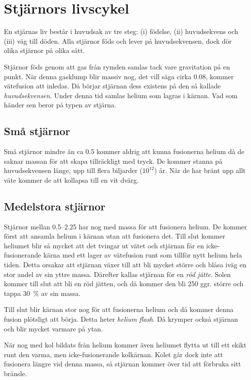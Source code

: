 \section{Stjärnors livscykel}
En stjärnas liv består i huvudsak av tre steg: (i) födelse, (ii) huvudsekvens och (iii) väg till döden. Alla stjärnor föds och lever på huvudsekvensen, dock dör olika stjärnor på olika sätt.

Stjärnor föds genom att gas från rymden samlas tack vare gravitation på en punkt. När denna gasklump blir massiv nog, det vill säga cirka \qty{0.08}{\Mo}, kommer vätefusion att inledas. Då börjar stjärnan dess existens på den så kallade \emph{huvudsekvensen}. Under denna tid samlas helium som lagras i kärnan. Vad som händer sen beror på typen av stjärna.

\subsection{Små stjärnor}
Små stjärnor mindre än ca \qty{0.5}{\Mo} kommer aldrig att kunna fusionerna helium då de saknar massan för att skapa tillräckligt med tryck. De kommer stanna på huvudsekvensen länge, upp till flera biljarder ($10^{12}$) år. När de har bränt upp allt väte kommer de att kollapsa till en vit dvärg.

\subsection{Medelstora stjärnor}
Stjärnor mellan \qtyrange{0.5}{2.25}{\Mo} har nog med massa för att fusionera helium. De kommer först att ansamla helium i kärnan utan att fusionera det. Till slut kommer heliumet blir så mycket att det tvingar ut vätet och stjärnan får en icke-fusionerande kärna med ett lager av vätefusion runt som tillför nytt helium hela tiden. Detta orsakar att stjärnan växer till att bli mycket större och blåsa iväg en stor andel av sin yttre massa. Därefter kallas stjärnan för en \emph{röd jätte}. Solen kommer till slut att bli en röd jätten, och då kommer den bli \num{250} ggr. större och tappa \qty{30}{\percent} av sin massa.

Till slut blir kärnan stor nog för att fusionerna helium och då kommer denna fusion plötsligt att börja. Detta heter \emph{helium flash}. Då krymper också stjärnan och blir mycket varmare på ytan.

När nog med kol bildats från helium kommer även heliumet flytta ut till ett skikt runt den varma, men icke-fusionerande kolkärnan. Kolet går dock inte att fusionera längre vid denna massa, så stjärnan kommer över tid att förbruka sitt bränsle.

